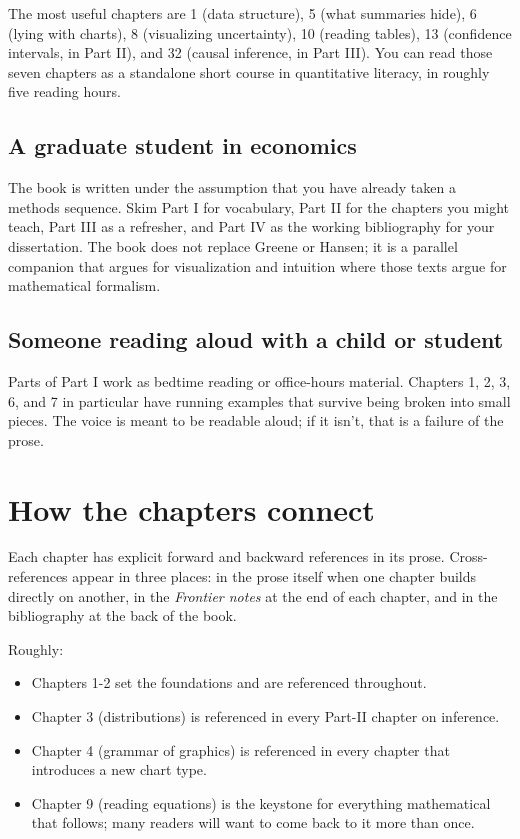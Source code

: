 \documentclass[
  letterpaper,
  11pt,
  twoside,
  openany]{scrbook}
\providecommand{\tightlist}{%
  \setlength{\itemsep}{0pt}\setlength{\parskip}{0pt}}
\begin{document}
The most useful chapters are 1 (data structure), 5 (what summaries
hide), 6 (lying with charts), 8 (visualizing uncertainty), 10 (reading
tables), 13 (confidence intervals, in Part II), and 32 (causal
inference, in Part III). You can read those seven chapters as a
standalone short course in quantitative literacy, in roughly five
reading hours.

\subsection{A graduate student in
economics}\label{a-graduate-student-in-economics}

The book is written under the assumption that you have already taken a
methods sequence. Skim Part I for vocabulary, Part II for the chapters
you might teach, Part III as a refresher, and Part IV as the working
bibliography for your dissertation. The book does not replace Greene or
Hansen; it is a parallel companion that argues for visualization and
intuition where those texts argue for mathematical formalism.

\subsection{Someone reading aloud with a child or
student}\label{someone-reading-aloud-with-a-child-or-student}

Parts of Part I work as bedtime reading or office-hours material.
Chapters 1, 2, 3, 6, and 7 in particular have running examples that
survive being broken into small pieces. The voice is meant to be
readable aloud; if it isn't, that is a failure of the prose.

\section{How the chapters connect}\label{how-the-chapters-connect}

Each chapter has explicit forward and backward references in its prose.
Cross-references appear in three places: in the prose itself when one
chapter builds directly on another, in the \emph{Frontier notes} at the
end of each chapter, and in the bibliography at the back of the book.

Roughly:

\begin{itemize}
\tightlist
\item
  Chapters 1-2 set the foundations and are referenced throughout.
\item
  Chapter 3 (distributions) is referenced in every Part-II chapter on
  inference.
\item
  Chapter 4 (grammar of graphics) is referenced in every chapter that
  introduces a new chart type.
\item
  Chapter 9 (reading equations) is the keystone for everything
  mathematical that follows; many readers will want to come back to it
  more than once.
\end{itemize}
\end{document}
